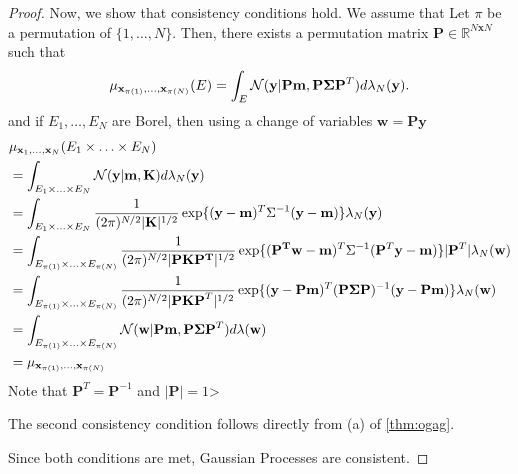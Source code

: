 \begin{proof}
    Now, we show that consistency conditions hold.
    We assume that Let $\pi$ be a permutation of $\{ 1, \ldots, N \}$.
    Then, there exists a permutation matrix $\mathbf{P} \in \mathbb{R}^{N \mathbf{x} N}$
    such that
    \begin{equation*}
        \mu_{\mathbf{x}_{\pi(1)}, \ldots, \mathbf{x}_{\pi(N)}}(E) =
        \int_{E} \mathcal{N}(\mathbf{y} | \mathbf{Pm}, \mathbf{P} \boldsymbol{\Sigma} \mathbf{P}^{T}) d \lambda_N(\mathbf{y}).
    \end{equation*}
    and if $E_1, \ldots, E_N$ are Borel, then using a change of variables $\mathbf{w} = \mathbf{Py}$
    \begin{align*}
        & \mu_{\mathbf{x}_1, \ldots, \mathbf{x}_N}(E_1 \times \ldots \times E_N) \\
        & = \int_{E_1 \times \ldots \times E_N} \mathcal{N}(\mathbf{y} | \mathbf{m}, \mathbf{K}) d \lambda_N(\mathbf{y}) \\
        & = \int_{E_1 \times \ldots \times E_N}
        \frac{ 1 }{ (2 \pi)^{N/2} \lvert \mathbf{K} \rvert^{1/2} }
        \exp \{ (\mathbf{y} - \mathbf{m})^{T} \Sigma^{-1} (\mathbf{y} - \mathbf{m}) \}
        \lambda_N(\mathbf{y}) \\
        & = \int_{E_{\pi(1)} \times \ldots \times E_{\pi(N)}}
        \frac{ 1 }{ (2 \pi)^{N/2} \lvert \mathbf{PKP^T} \rvert^{1/2} }
        \exp \{ (\mathbf{P^Tw} - \mathbf{m})^{T} \Sigma^{-1} (\mathbf{P}^{T}\mathbf{y} - \mathbf{m}) \}
        \lvert \mathbf{P}^{T} \rvert \lambda_N(\mathbf{w}) \\
        & = \int_{E_{\pi(1)} \times \ldots \times E_{\pi(N)}}
        \frac{ 1 }{ (2 \pi)^{N/2} \lvert \mathbf{PKP}^T \rvert^{1/2} }
        \exp \{ (\mathbf{y} - \mathbf{Pm})^{T} (\mathbf{P}\boldsymbol{\Sigma} \mathbf{P})^{-1} (\mathbf{y} - \mathbf{P}\mathbf{m}) \} \lambda_N(\mathbf{w}) \\
        & = \int_{E_{\pi(1)} \times \ldots \times E_{\pi(N)}}
        \mathcal{N}(\mathbf{w} | \mathbf{Pm}, \mathbf{P} \boldsymbol{\Sigma} \mathbf{P}^{T}) d \lambda(\mathbf{w}) \\
        &= \mu_{\mathbf{x}_{\pi(1)}, \ldots, \mathbf{x}_{\pi(N)}}
    \end{align*}
    Note that $\mathbf{P}^{T} = \mathbf{P}^{-1}$ and $\lvert \mathbf{P} \rvert = 1$>

    The second consistency condition follows directly from (a) of \ref{thm:ogag}.

    Since both conditions are met, Gaussian Processes are consistent.
\end{proof}

